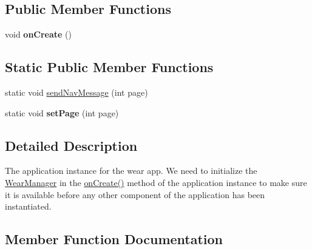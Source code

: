\subsection*{Public Member Functions}
\begin{DoxyCompactItemize}
\item 
void {\bfseries on\+Create} ()\hypertarget{classcom_1_1example_1_1android_1_1wearable_1_1wcldemo_1_1WearApplication_a1756597d3635d2212281884860aa8cf1}{}\label{classcom_1_1example_1_1android_1_1wearable_1_1wcldemo_1_1WearApplication_a1756597d3635d2212281884860aa8cf1}

\end{DoxyCompactItemize}
\subsection*{Static Public Member Functions}
\begin{DoxyCompactItemize}
\item 
static void \hyperlink{classcom_1_1example_1_1android_1_1wearable_1_1wcldemo_1_1WearApplication_a515c8df5afb40f771f8ef56736e6b03c}{send\+Nav\+Message} (int page)
\item 
static void {\bfseries set\+Page} (int page)\hypertarget{classcom_1_1example_1_1android_1_1wearable_1_1wcldemo_1_1WearApplication_a0ee33a61e4a9c03b41b5e8db6bac9fdd}{}\label{classcom_1_1example_1_1android_1_1wearable_1_1wcldemo_1_1WearApplication_a0ee33a61e4a9c03b41b5e8db6bac9fdd}

\end{DoxyCompactItemize}


\subsection{Detailed Description}
The application instance for the wear app. We need to initialize the \hyperlink{}{Wear\+Manager} in the \hyperlink{}{on\+Create()} method of the application instance to make sure it is available before any other component of the application has been instantiated. 

\subsection{Member Function Documentation}
